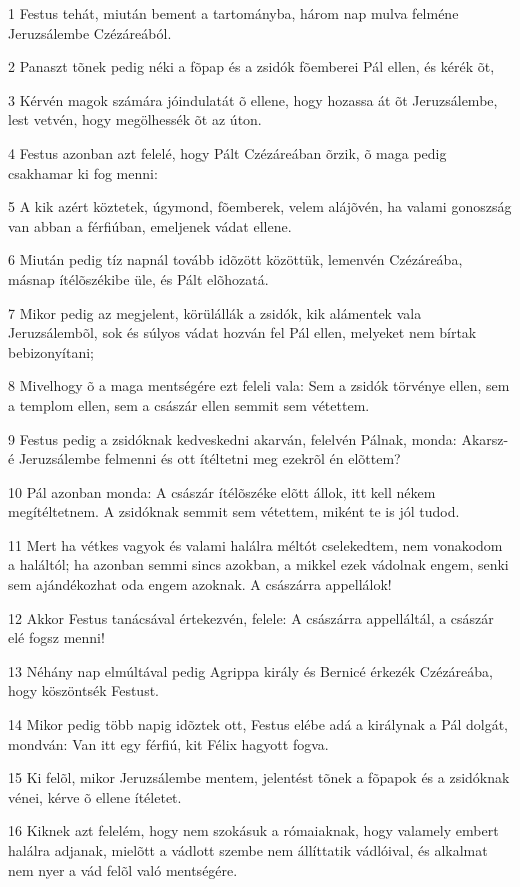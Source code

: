 \par 1 Festus tehát, miután bement a tartományba, három nap mulva felméne Jeruzsálembe Czézáreából.
\par 2 Panaszt tõnek pedig néki a fõpap és a zsidók fõemberei Pál ellen, és kérék õt,
\par 3 Kérvén magok számára jóindulatát õ ellene, hogy hozassa át õt Jeruzsálembe, lest vetvén, hogy megölhessék õt az úton.
\par 4 Festus azonban azt felelé, hogy Pált Czézáreában õrzik, õ maga pedig csakhamar ki fog menni:
\par 5 A kik azért köztetek, úgymond, fõemberek, velem alájõvén, ha valami gonoszság van abban a férfiúban, emeljenek vádat ellene.
\par 6 Miután pedig tíz napnál tovább idõzött közöttük, lemenvén Czézáreába, másnap ítélõszékibe üle, és Pált elõhozatá.
\par 7 Mikor pedig az megjelent, körülállák a zsidók, kik alámentek vala Jeruzsálembõl, sok és súlyos vádat hozván fel Pál ellen, melyeket nem bírtak bebizonyítani;
\par 8 Mivelhogy õ a maga mentségére ezt feleli vala: Sem a zsidók törvénye ellen, sem a templom ellen, sem a császár ellen semmit sem vétettem.
\par 9 Festus pedig a zsidóknak kedveskedni akarván, felelvén Pálnak, monda: Akarsz-é Jeruzsálembe felmenni és ott ítéltetni meg ezekrõl én elõttem?
\par 10 Pál azonban monda: A császár ítélõszéke elõtt állok, itt kell nékem megítéltetnem. A zsidóknak semmit sem vétettem, miként te is jól tudod.
\par 11 Mert ha vétkes vagyok és valami halálra méltót cselekedtem, nem vonakodom a haláltól; ha azonban semmi sincs azokban, a mikkel ezek vádolnak engem, senki sem ajándékozhat oda engem azoknak. A császárra appellálok!
\par 12 Akkor Festus tanácsával értekezvén, felele: A császárra appelláltál, a császár elé fogsz menni!
\par 13 Néhány nap elmúltával pedig Agrippa király és Bernicé érkezék Czézáreába, hogy köszöntsék Festust.
\par 14 Mikor pedig több napig idõztek ott, Festus elébe adá a királynak a Pál dolgát, mondván: Van itt egy férfiú, kit Félix hagyott fogva.
\par 15 Ki felõl, mikor Jeruzsálembe mentem, jelentést tõnek a fõpapok és a zsidóknak vénei, kérve õ ellene ítéletet.
\par 16 Kiknek azt felelém, hogy nem szokásuk a rómaiaknak, hogy valamely embert halálra adjanak, mielõtt a vádlott szembe nem állíttatik vádlóival, és alkalmat nem nyer a vád felõl való mentségére.
